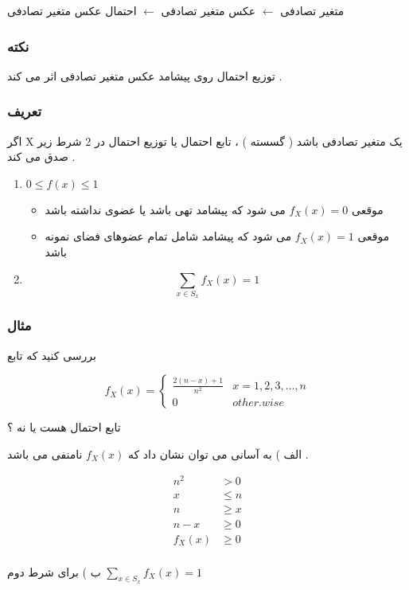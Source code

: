 \documentclass[12pt]{book}
\begin{document}
متغیر تصادفی  $\leftarrow$  عکس متغیر تصادفی   $\leftarrow$   احتمال عکس متغیر تصادفی   

\subsubsection{نکته}
توزیع احتمال روی پیشامد عکس متغیر تصادفی اثر می کند .


\subsubsection{تعریف}
اگر X یک متغیر تصادفی باشد ( گسسته ) ، تابع احتمال یا توزیع احتمال در 2 شرط زیر صدق می کند .


\begin{enumerate}
	\item $0 \leq f(x) \leq 1$
	\begin{itemize}
		\item موقعی
		$f_{X}(x) = 0$
		می شود که پیشامد تهی باشد یا عضوی نداشته باشد
		\item موقعی
		$f_{X}(x) = 1$
		می شود که پیشامد شامل تمام عضوهای فضای نمونه باشد 
	\end{itemize}
	\item $$\sum_{x \in S_{x}}{f_{X}(x)} = 1$$
\end{enumerate}




\subsubsection{مثال}
بررسی کنید که تابع


$$
f_{X}(x) = 
\begin{cases}
\frac{2(n-x)+1}{n^{2}} & x=1,2,3,\dots,n \\
0 & other.wise
\end{cases}
$$

تابع احتمال هست یا نه ؟


الف ) به آسانی می توان نشان داد که
$f_{X}(x)$
نامنفی می باشد .

\begin{align*}
n^{2} &> 0 \\
x &\leq n \\
n &\geq x \\
n - x &\geq 0 \\
f_{X}(x) &\geq 0 \\
\end{align*}


ب ) برای شرط دوم $\sum_{x \in S_{x}} f_{X}(x) = 1$
\end{document}
